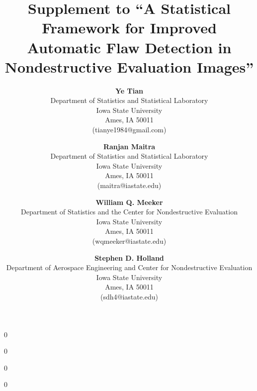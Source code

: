 \documentclass[12pt]{article}
\newcommand{\blinded}{0}
\begin{document}


\blinded
{
}
\fi
{}\blinded
{
}
\fi

\title{\vspace{-0.8in} Supplement to ``A Statistical Framework for
  Improved Automatic Flaw Detection in Nondestructive Evaluation Images''} 
\blinded
{
\author{
  \vspace{-0.1in}
  {\bf Ye Tian}\\
  \vspace{-0.2in}
  Department of Statistics and Statistical Laboratory\\
    Iowa State University\\
    Ames, IA 50011\\
    (tianye1984@gmail.com)\\
\and
    \vspace{-0.2in}
    {\bf Ranjan Maitra}\\
    \vspace{-0.2in}
    Department of Statistics and Statistical Laboratory\\
    Iowa State University\\
    Ames, IA 50011\\
    (maitra@iastate.edu)
    \and
    \vspace{-0.2in}
           {\bf William Q. Meeker}\\
           \vspace{-0.2in}
           Department of Statistics and the Center for Nondestructive
           Evaluation\\
           Iowa State University\\
           Ames, IA 50011\\
           (wqmeeker@iastate.edu)
           \and
           \vspace{-0.2in}
                  {\bf Stephen D. Holland}\\
                  \vspace{-0.2in}
                  Department of Aerospace Engineering and Center for Nondestructive Evaluation\\
                  Iowa State University\\
                  Ames, IA 50011\\
                  (sdh4@iastate.edu)
}
\date{\vspace{-0.5in}}
}
\fi
{}\blinded
    {
      \date{\vspace{-1.2in}}
      \renewcommand{\baselinestretch}{1.4}\normalsize
    }
\fi
\maketitle
\renewcommand{\baselinestretch}{1.4}\normalsize
\end{document}
